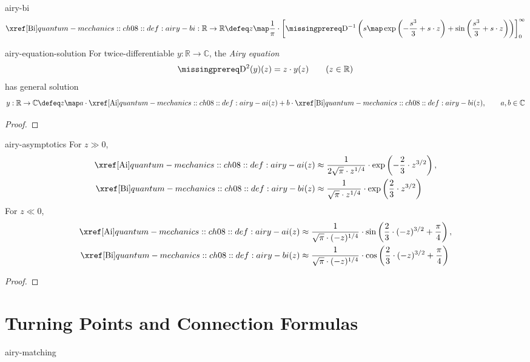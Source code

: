 \documentclass[12pt]{article}
\begin{document}
\begin{dfn}{airy-bi}
  \[
    \AiryBi:\mathbb R\to\mathbb R\defeq z\map
    \frac1\pi\cdot\left[\DiffOp^{-1}\left(s\map
      \exp\left(-\frac{s^3}{3}+s\cdot z\right)
      +\sin\left(\frac{s^3}{3}+s\cdot z\right)
    \right)\right]_0^\infty
  \]
\end{dfn}

\begin{thm}{airy-equation-solution}
  For twice-differentiable $y:\mathbb R\to\mathbb C$, the \emph{Airy equation}
  \[
    \DiffOp^2(y)(z)=z\cdot y(z)\qquad(z\in\mathbb R)
  \]
  has general solution
  \[
    y:\mathbb R\to\mathbb C\defeq z\map
    a\cdot\AiryAi(z)+b\cdot\AiryBi(z),
    \qquad a,b\in\mathbb C
  \]
\end{thm}

\begin{proof}
  \todo
\end{proof}

\begin{thm}{airy-asymptotics}
  For $z\gg0$,
  \[
    \begin{aligned}
      \AiryAi(z)&\approx\frac1{2\sqrt\pi\cdot z^{1/4}}\cdot
        \exp\left(-\frac23\cdot z^{3/2}\right),\\
      \AiryBi(z)&\approx\frac1{\sqrt\pi\cdot z^{1/4}}\cdot
        \exp\left(\frac23\cdot z^{3/2}\right)
    \end{aligned}
  \]
  For $z\ll0$,
  \[
    \begin{aligned}
      \AiryAi(z)&\approx\frac1{\sqrt\pi\cdot(-z)^{1/4}}\cdot
        \sin\left(\frac23\cdot(-z)^{3/2}+\frac\pi4\right),\\
      \AiryBi(z)&\approx\frac1{\sqrt\pi\cdot(-z)^{1/4}}\cdot
        \cos\left(\frac23\cdot(-z)^{3/2}+\frac\pi4\right)
    \end{aligned}
  \]
\end{thm}

\begin{proof}
  \todo
\end{proof}

\section{Turning Points and Connection Formulas}

\begin{rem}{airy-matching}
  \todo
\end{rem}
\end{document}
